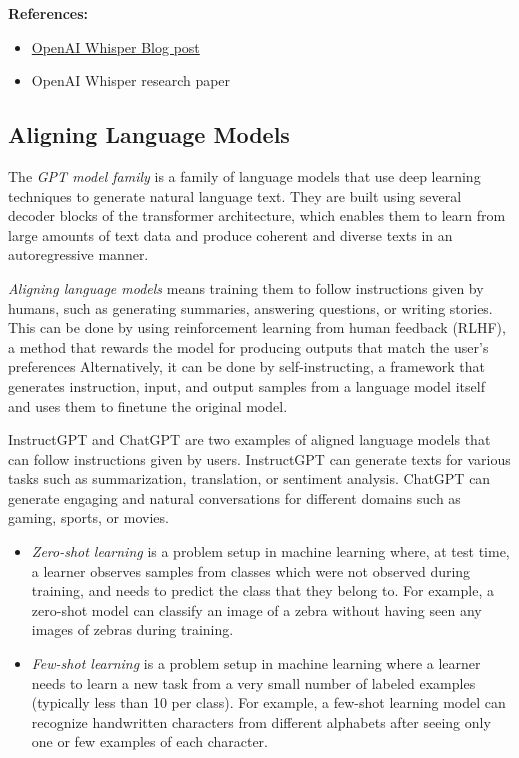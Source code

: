 \documentclass[11pt, a4paper]{amsart}
\begin{document}
\noindent \textbf{References:}
\begin{itemize}
	\item \href{https://openai.com/research/whisper}{OpenAI Whisper Blog post}
	\item OpenAI Whisper research paper \cite{radford2022robust}
\end{itemize}


\subsection{Aligning Language Models}

The \emph{GPT model family} is a family of language models that use deep learning techniques to generate natural language text.
They are built using several decoder blocks of the transformer architecture, which enables them to learn from large amounts of text data and produce coherent and diverse texts in an autoregressive manner.

\emph{Aligning language models} means training them to follow instructions given by humans, such as generating summaries, answering questions, or writing stories.
This can be done by using reinforcement learning from human feedback (RLHF), a method that rewards the model for producing outputs that match the user’s preferences
Alternatively, it can be done by self-instructing, a framework that generates instruction, input, and output samples from a language model itself and uses them to finetune the original model.

InstructGPT and ChatGPT are two examples of aligned language models that can follow instructions given by users. 
InstructGPT can generate texts for various tasks such as summarization, translation, or sentiment analysis.
ChatGPT can generate engaging and natural conversations for different domains such as gaming, sports, or movies.

\begin{itemize}
	\item \emph{Zero-shot learning} is a problem setup in machine learning where, at test time, a learner observes samples from classes which were not observed during training, and needs to predict the class that they belong to.
	For example, a zero-shot model can classify an image of a zebra without having seen any images of zebras during training.
	
	\item \emph{Few-shot learning} is a problem setup in machine learning where a learner needs to learn a new task from a very small number of labeled examples (typically less than 10 per class).
	For example, a few-shot learning model can recognize handwritten characters from different alphabets after seeing only one or few examples of each character.
\end{itemize}
\end{document}
